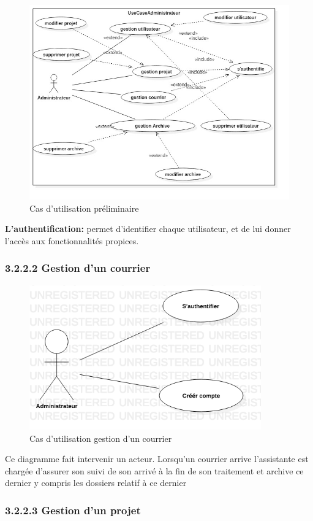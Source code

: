 \documentclass[14pt,A4,french,oneside,leqno]{report}
\begin{document}
\begin{figure}[th]
	\centering
	\includegraphics[width=0.7\linewidth]{UseCaseDiagram3}
	\caption{ Cas d'utilisation préliminaire}
	\label{fig:usecasediagram3}
\end{figure}
\textbf{L'authentification:} permet d'identifier chaque utilisateur, et de lui donner l'accès aux fonctionnalités propices.
\newpage
\subsubsection{3.2.2.2  Gestion d'un courrier}
\begin{figure}[h]
	\centering
	\includegraphics[width=10cm]{UseCaseDiagram1}
	\caption{Cas d'utilisation gestion d'un courrier}
	\label{fig:usecasediagram1}
\end{figure}
\textrm{Ce diagramme fait intervenir un acteur. Lorsqu'un courrier arrive l'assistante est chargée d'assurer son suivi de son arrivé à la fin de son traitement et archive ce dernier y compris les dossiers relatif à ce dernier}

\subsubsection{3.2.2.3  Gestion d'un projet}
\end{document}
